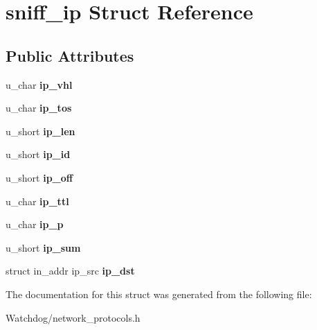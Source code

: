 \hypertarget{structsniff__ip}{\section{sniff\-\_\-ip Struct Reference}
\label{structsniff__ip}
}
\subsection*{Public Attributes}
\begin{DoxyCompactItemize}
\item 
\hypertarget{structsniff__ip_a8ced3d6237cb8b0538e73227843b4edb}{u\-\_\-char {\bfseries ip\-\_\-vhl}}\label{structsniff__ip_a8ced3d6237cb8b0538e73227843b4edb}

\item 
\hypertarget{structsniff__ip_aa850a52985272f13d6866d14be1ecdf6}{u\-\_\-char {\bfseries ip\-\_\-tos}}\label{structsniff__ip_aa850a52985272f13d6866d14be1ecdf6}

\item 
\hypertarget{structsniff__ip_aa4907e31555a52a20bc0eadc46d45044}{u\-\_\-short {\bfseries ip\-\_\-len}}\label{structsniff__ip_aa4907e31555a52a20bc0eadc46d45044}

\item 
\hypertarget{structsniff__ip_a9cae00d3f7491ce2bfcb086880b1aa6a}{u\-\_\-short {\bfseries ip\-\_\-id}}\label{structsniff__ip_a9cae00d3f7491ce2bfcb086880b1aa6a}

\item 
\hypertarget{structsniff__ip_aecf13449d60d1e0b7d78a64fcd3e54de}{u\-\_\-short {\bfseries ip\-\_\-off}}\label{structsniff__ip_aecf13449d60d1e0b7d78a64fcd3e54de}

\item 
\hypertarget{structsniff__ip_abed391544944e353d09e85030f423ec8}{u\-\_\-char {\bfseries ip\-\_\-ttl}}\label{structsniff__ip_abed391544944e353d09e85030f423ec8}

\item 
\hypertarget{structsniff__ip_a49d22326de644e4d1158ef7ae4fb22b7}{u\-\_\-char {\bfseries ip\-\_\-p}}\label{structsniff__ip_a49d22326de644e4d1158ef7ae4fb22b7}

\item 
\hypertarget{structsniff__ip_a263384b09865cda4a03e3451de740c84}{u\-\_\-short {\bfseries ip\-\_\-sum}}\label{structsniff__ip_a263384b09865cda4a03e3451de740c84}

\item 
\hypertarget{structsniff__ip_ad2db4a1d3fbfb1bcc44e5a26d6c28c2e}{struct in\-\_\-addr ip\-\_\-src {\bfseries ip\-\_\-dst}}\label{structsniff__ip_ad2db4a1d3fbfb1bcc44e5a26d6c28c2e}

\end{DoxyCompactItemize}


The documentation for this struct was generated from the following file\-:\begin{DoxyCompactItemize}
\item 
Watchdog/network\-\_\-protocols.\-h\end{DoxyCompactItemize}
